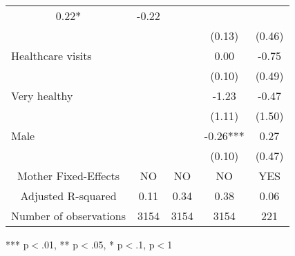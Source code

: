 \begin{tabular}{lllll}
  \multicolumn{1}{c}{0.22* } &
  \multicolumn{1}{c}{-0.22 } \\
\multicolumn{1}{l}{} &
  \multicolumn{1}{c}{} &
  \multicolumn{1}{c}{} &
  \multicolumn{1}{c}{(0.13)} &
  \multicolumn{1}{c}{(0.46)} \\
\multicolumn{1}{l}{Healthcare visits} &
  \multicolumn{1}{c}{} &
  \multicolumn{1}{c}{} &
  \multicolumn{1}{c}{0.00 } &
  \multicolumn{1}{c}{-0.75 } \\
\multicolumn{1}{l}{} &
  \multicolumn{1}{c}{} &
  \multicolumn{1}{c}{} &
  \multicolumn{1}{c}{(0.10)} &
  \multicolumn{1}{c}{(0.49)} \\
\multicolumn{1}{l}{Very healthy} &
  \multicolumn{1}{c}{} &
  \multicolumn{1}{c}{} &
  \multicolumn{1}{c}{-1.23 } &
  \multicolumn{1}{c}{-0.47 } \\
\multicolumn{1}{l}{} &
  \multicolumn{1}{c}{} &
  \multicolumn{1}{c}{} &
  \multicolumn{1}{c}{(1.11)} &
  \multicolumn{1}{c}{(1.50)} \\
\multicolumn{1}{l}{Male} &
  \multicolumn{1}{c}{} &
  \multicolumn{1}{c}{} &
  \multicolumn{1}{c}{-0.26***} &
  \multicolumn{1}{c}{0.27 } \\
\multicolumn{1}{l}{} &
  \multicolumn{1}{c}{} &
  \multicolumn{1}{c}{} &
  \multicolumn{1}{c}{(0.10)} &
  \multicolumn{1}{c}{(0.47)} \\
\multicolumn{1}{c}{Mother Fixed-Effects} &
  \multicolumn{1}{c}{NO} &
  \multicolumn{1}{c}{NO} &
  \multicolumn{1}{c}{NO} &
  \multicolumn{1}{c}{YES} \\
\multicolumn{1}{c}{Adjusted R-squared} &
  \multicolumn{1}{c}{0.11} &
  \multicolumn{1}{c}{0.34} &
  \multicolumn{1}{c}{0.38} &
  \multicolumn{1}{c}{0.06} \\
\multicolumn{1}{c}{Number of observations} &
  \multicolumn{1}{c}{3154} &
  \multicolumn{1}{c}{3154} &
  \multicolumn{1}{c}{3154} &
  \multicolumn{1}{c}{221} \\
\cline{1-5}
\end{tabular}

\footnotesize{
*** p$<$.01, ** p$<$.05, * p$<$.1,  p$<$1
}
